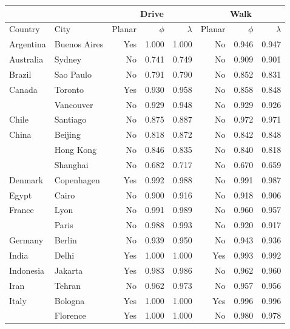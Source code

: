 \begin{tabular}{ l l r r r r r r  }
\toprule
             &               & \multicolumn{3}{|c|}{Drive}         & \multicolumn{3}{c}{Walk}            \\
\midrule
Country      & City          &  Planar  &  $\phi$   &  $\lambda$   &  Planar  &  $\phi$   &  $\lambda$   \\
\midrule
Argentina & Buenos Aires &      Yes &  1.000 &  1.000 &       No &  0.946 &  0.947 \\
Australia & Sydney &       No &  0.741 &  0.749 &       No &  0.909 &  0.901 \\
Brazil & Sao Paulo &       No &  0.791 &  0.790 &       No &  0.852 &  0.831 \\
Canada & Toronto &      Yes &  0.930 &  0.958 &       No &  0.858 &  0.848 \\
          & Vancouver &       No &  0.929 &  0.948 &       No &  0.929 &  0.926 \\
Chile & Santiago &       No &  0.875 &  0.887 &       No &  0.972 &  0.971 \\
China & Beijing &       No &  0.818 &  0.872 &       No &  0.842 &  0.848 \\
          & Hong Kong &       No &  0.846 &  0.835 &       No &  0.840 &  0.818 \\
          & Shanghai &       No &  0.682 &  0.717 &       No &  0.670 &  0.659 \\
Denmark & Copenhagen &      Yes &  0.992 &  0.988 &       No &  0.991 &  0.987 \\
Egypt & Cairo &       No &  0.900 &  0.916 &       No &  0.918 &  0.906 \\
France & Lyon &       No &  0.991 &  0.989 &       No &  0.960 &  0.957 \\
          & Paris &       No &  0.988 &  0.993 &       No &  0.920 &  0.917 \\
Germany & Berlin &       No &  0.939 &  0.950 &       No &  0.943 &  0.936 \\
India & Delhi &      Yes &  1.000 &  1.000 &      Yes &  0.993 &  0.992 \\
Indonesia & Jakarta &      Yes &  0.983 &  0.986 &       No &  0.962 &  0.960 \\
Iran & Tehran &       No &  0.962 &  0.973 &       No &  0.957 &  0.956 \\
Italy & Bologna &      Yes &  1.000 &  1.000 &      Yes &  0.996 &  0.996 \\
          & Florence &      Yes &  1.000 &  1.000 &       No &  0.980 &  0.978 \\

\end{tabular}
